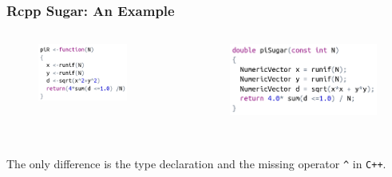 \documentclass{beamer}
\def\code#1{\texttt{#1}} %
\begin{document}
\begin{frame}
\frametitle{Rcpp Sugar: An Example}
\begin{columns}
\begin{figure}[htb]
    \centering
    \includegraphics[width=0.8\textwidth]{sugar_piR.png}
\end{figure} \pause
{}
\begin{figure}[htb]
    \centering
    \includegraphics[width=1.1\textwidth]{sugar_piSugar.png}
\end{figure} 
\vspace{2mm}
\pause
\end{columns}
\\
\vspace{3mm}
The only difference is the type declaration and the missing operator \code{\^} in \code{C++}.

\end{frame}
\end{document}
